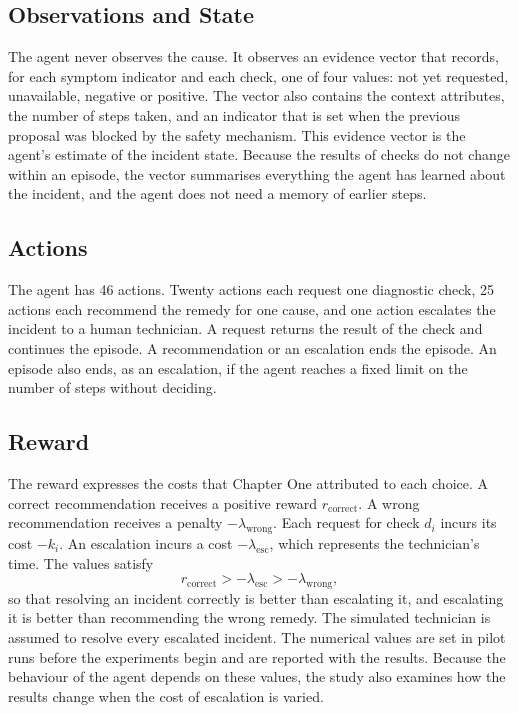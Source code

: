 \documentclass[12pt,a4paper]{article}
\begin{document}
\subsection{Observations and State}

The agent never observes the cause. It observes an evidence vector that records, for each symptom indicator and each check, one of four values: not yet requested, unavailable, negative or positive. The vector also contains the context attributes, the number of steps taken, and an indicator that is set when the previous proposal was blocked by the safety mechanism. This evidence vector is the agent's estimate of the incident state. Because the results of checks do not change within an episode, the vector summarises everything the agent has learned about the incident, and the agent does not need a memory of earlier steps.

\subsection{Actions}

The agent has 46 actions. Twenty actions each request one diagnostic check, 25 actions each recommend the remedy for one cause, and one action escalates the incident to a human technician. A request returns the result of the check and continues the episode. A recommendation or an escalation ends the episode. An episode also ends, as an escalation, if the agent reaches a fixed limit on the number of steps without deciding.

\subsection{Reward}

The reward expresses the costs that Chapter One attributed to each choice. A correct recommendation receives a positive reward $r_{\text{correct}}$. A wrong recommendation receives a penalty $-\lambda_{\text{wrong}}$. Each request for check $d_i$ incurs its cost $-k_i$. An escalation incurs a cost $-\lambda_{\text{esc}}$, which represents the technician's time. The values satisfy
\begin{equation}
r_{\text{correct}} > -\lambda_{\text{esc}} > -\lambda_{\text{wrong}},
\label{eq:reward}
\end{equation}
so that resolving an incident correctly is better than escalating it, and escalating it is better than recommending the wrong remedy. The simulated technician is assumed to resolve every escalated incident. The numerical values are set in pilot runs before the experiments begin and are reported with the results. Because the behaviour of the agent depends on these values, the study also examines how the results change when the cost of escalation is varied.
\end{document}
